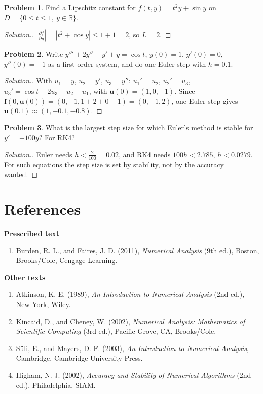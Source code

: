 \documentclass[11pt,a4paper]{article}
\numberwithin{equation}{section}
\theoremstyle{definition}
\newtheorem{problemx}{Problem}[subsection]
\newenvironment{problem}{\begin{problemx}}{\end{problemx}}
\newenvironment{solution}
  {\renewcommand{\qedsymbol}{}\begin{proof}[\textit{Solution}.]}
  {\end{proof}}
\newcommand{\subhead}[1]{%
  \par\medskip\noindent\textbf{#1}\par\nobreak\smallskip}
\begin{document}
\begin{problem}
Find a Lipschitz constant for $f(t,y) = t^2y+\sin y$ on $D = \{0\leq t\leq1,\ y\in\mathbb R\}$.
\end{problem}
\begin{solution}
$\left|\frac{\partial f}{\partial y}\right| = |t^2+\cos y|\leq1+1 = 2$, so $L = 2$.
\end{solution}

\begin{problem}
Write $y'''+2y''-y'+y = \cos t$, $y(0) = 1$, $y'(0) = 0$, $y''(0) = -1$ as a first-order system, and do one Euler step with $h = 0.1$.
\end{problem}
\begin{solution}
With $u_1 = y$, $u_2 = y'$, $u_3 = y''$: $u_1' = u_2$, $u_2' = u_3$, $u_3' = \cos t-2u_3+u_2-u_1$, with $\mathbf u(0) = (1,0,-1)$. Since
$\mathbf f(0,\mathbf u(0)) = (0,-1,1+2+0-1) = (0,-1,2)$, one Euler step gives $\mathbf u(0.1)\approx(1,-0.1,-0.8)$.
\end{solution}

\begin{problem}
What is the largest step size for which Euler's method is stable for $y' = -100y$? For RK4?
\end{problem}
\begin{solution}
Euler needs $h<\frac{2}{100} = 0.02$, and RK4 needs $100h<2.785$, $h<0.0279$. For such equations the step size is set by stability, not by the
accuracy wanted.
\end{solution}


\clearpage
\section*{References}

\subhead{Prescribed text}
\begin{enumerate}
\item Burden, R. L., and Faires, J. D. (2011), \emph{Numerical Analysis} (9th ed.), Boston, Brooks/Cole, Cengage Learning.
\end{enumerate}

\subhead{Other texts}
\begin{enumerate}
\item Atkinson, K. E. (1989), \emph{An Introduction to Numerical Analysis} (2nd ed.), New York, Wiley.
\item Kincaid, D., and Cheney, W. (2002), \emph{Numerical Analysis: Mathematics of Scientific Computing} (3rd ed.), Pacific Grove, CA,
Brooks/Cole.
\item S\"uli, E., and Mayers, D. F. (2003), \emph{An Introduction to Numerical Analysis}, Cambridge, Cambridge University Press.
\item Higham, N. J. (2002), \emph{Accuracy and Stability of Numerical Algorithms} (2nd ed.), Philadelphia, SIAM.
\end{enumerate}
\end{document}
